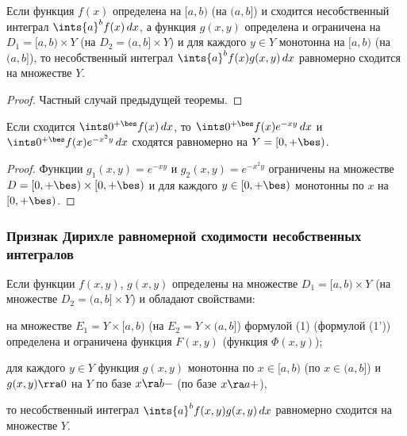 \documentclass[a4paper]{article}
\newenvironment{imp*}{\par\vskip\theoremskip\textbf{Следствие.}\normalfont \itshape}{\par\vskip\theoremskip}
\begin{document}
\begin{imp*}
Если функция $f(x)$ определена на $[a,b)$ (на $(a,b]$) и сходится
несобственный интеграл $\ints{a}^b f(x)\,dx$, а функция $g(x,y)$
определена и ограничена на $D_1=[a,b)\times Y$ (на $D_2=(a,b]\times
Y$) и для каждого $y\in Y$ монотонна на $[a,b)$ (на $(a,b]$), то
несобственный интеграл $\ints{a}^b f(x)g(x,y)\,dx$ равномерно
сходится на множестве $Y$.
\end{imp*}

\begin{proof}
Частный случай предыдущей теоремы.
\end{proof}

\begin{ex}
Если сходится $\ints0^{+\bes} f(x)\,dx$, то $\ints0^{+\bes}
f(x)e^{-xy}\,dx$ и $\ints0^{+\bes} f(x) e^{-x^2y}\,dx$ сходятся
равномерно на $Y=[0,+\bes)$.
\end{ex}

\begin{proof}
Функции $g_1(x,y)=e^{-xy}$ и $g_2(x,y)=e^{-x^2y}$ ограничены на
множестве $D=[0,+\bes)\times [0,+\bes)$ и для каждого
$y\in[0,+\bes)$ монотонны по $x$ на $[0,+\bes)$.
\end{proof}

\subsubsection{Признак Дирихле равномерной сходимости несобственных
интегралов}

\begin{theorem}
Если функции $f(x,y)$, $g(x,y)$ определены на множестве
$D_1=[a,b)\times Y$ (на множестве $D_2=(a,b]\times Y$) и обладают
свойствами: \begin{nums}{-2} \item на множестве $E_1=Y\times[a,b)$
(на $E_2=Y\times(a,b]$) формулой (1) (формулой (1')) определена и
ограничена функция $F(x,y)$ (функция $\Phi(x,y)$); \item для каждого
$y\in Y$ функция $g(x,y)$ монотонна по $x\in[a,b)$ (по $x\in(a,b]$)
и $g(x,y)\rra0$ на $Y$ по базе $x\ra b-$ (по базе $x\ra
a+$),\end{nums} то несобственный интеграл $\ints{a}^b f(x,y)g(x,y)
\, dx$ равномерно сходится на множестве $Y$.
\end{theorem}
\end{document}
